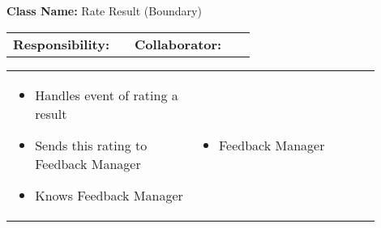 \begin{red_cards}[]
    \textbf{Class Name:} Rate Result (Boundary)
    \tcbline
    \begin{tabular}{p{0.45\linewidth} | p{0.45\linewidth}}
        \textbf{Responsibility:}& 
        \textbf{Collaborator:}\\
    \end{tabular}
    \tcbline
    \begin{tabular}{p{0.45\linewidth} | p{0.45\linewidth}}
        \begin{itemize}
            \item Handles event of rating a result
            \item Sends this rating to Feedback Manager
            \item Knows Feedback Manager
        \end{itemize}
        &
        \begin{itemize}
            \item Feedback Manager
        \end{itemize}
    \end{tabular}
\end{red_cards}